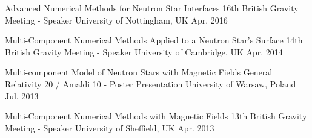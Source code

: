 

\begin{cventries}

  \presentry
    {Advanced Numerical Methods for Neutron Star Interfaces} %
    {16th British Gravity Meeting - Speaker} %
    {University of Nottingham, UK} %
    {Apr. 2016} %

\end{cventries}
\begin{cventries}

  \presentry
    {Multi-Component Numerical Methods  Applied to a Neutron Star's Surface} %
    {14th British Gravity Meeting - Speaker} %
    {University of Cambridge, UK} %
    {Apr. 2014} %

\end{cventries}
\begin{cventries}

  \presentry
    {Multi-component Model of Neutron Stars with Magnetic Fields} %
    {General Relativity 20 / Amaldi 10 - Poster Presentation} %
    {University of Warsaw, Poland} %
    {Jul. 2013} %
\end{cventries}
\begin{cventries}

  \presentry
    {Multi-Component Numerical Methods with Magnetic Fields} %
    {13th British Gravity Meeting - Speaker} %
    {University of Sheffield, UK} %
    {Apr. 2013} %

\end{cventries}

